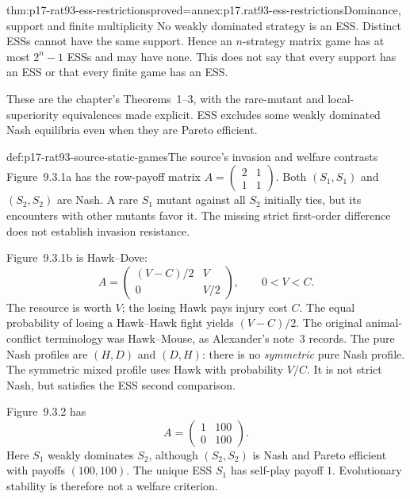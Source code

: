 \begin{hbtheorem}{thm:p17-rat93-ess-restrictions}{proved=annex:p17.rat93-ess-restrictions}{Dominance, support and finite multiplicity}
No weakly dominated strategy is an ESS. Distinct ESSs cannot have the
same support. Hence an \(n\)-strategy matrix game has at most
\(2^n-1\) ESSs and may have none. This does not say that every support
has an ESS or that every finite game has an ESS.
\end{hbtheorem}

These are the chapter's Theorems~1--3, with the rare-mutant and
local-superiority equivalences made explicit. ESS excludes some weakly
dominated Nash equilibria even when they are Pareto efficient.
\cite[Sec.~3, pp.~554--556]{Alexander2021EvolutionaryGames}

\begin{hbexample}{def:p17-rat93-source-static-games}{The source's invasion and welfare contrasts}
Figure~9.3.1a has the row-payoff matrix
\(A=\left(\begin{smallmatrix}2&1\\1&1\end{smallmatrix}\right)\).
Both \((S_1,S_1)\) and \((S_2,S_2)\) are Nash. A rare \(S_1\)
mutant against all \(S_2\) initially ties, but its encounters with
other mutants favor it. The missing strict first-order difference does
not establish invasion resistance.

Figure~9.3.1b is Hawk--Dove:
\[
 A=\begin{pmatrix}(V-C)/2&V\\0&V/2\end{pmatrix},\qquad 0<V<C.
\]
The resource is worth \(V\); the losing Hawk pays injury cost \(C\).
The equal probability of losing a Hawk--Hawk fight yields \((V-C)/2\).
The original animal-conflict terminology was Hawk--Mouse, as Alexander's
note~3 records. The pure Nash profiles are \((H,D)\) and \((D,H)\):
there is no \emph{symmetric} pure Nash profile. The symmetric mixed
profile uses Hawk with probability \(V/C\). It is not strict Nash,
but satisfies the ESS second comparison.

Figure~9.3.2 has
\[
 A=\begin{pmatrix}1&100\\0&100\end{pmatrix}.
\]
Here \(S_1\) weakly dominates \(S_2\), although \((S_2,S_2)\)
is Nash and Pareto efficient with payoffs \((100,100)\). The unique
ESS \(S_1\) has self-play payoff \(1\). Evolutionary stability is
therefore not a welfare criterion.
\end{hbexample}

